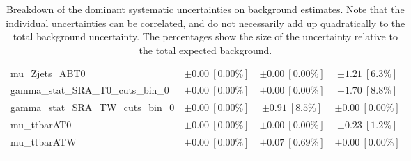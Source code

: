 \begin{table}
\begin{center}
\begin{tabular*}{\textwidth}{@{\extracolsep{\fill}}lccc}
mu\_Zjets\_ABT0         & $\pm 0.00\ [0.00\%] $          & $\pm 0.00\ [0.00\%] $          & $\pm 1.21\ [6.3\%] $       \\
gamma\_stat\_SRA\_T0\_cuts\_bin\_0         & $\pm 0.00\ [0.00\%] $          & $\pm 0.00\ [0.00\%] $          & $\pm 1.70\ [8.8\%] $       \\
gamma\_stat\_SRA\_TW\_cuts\_bin\_0         & $\pm 0.00\ [0.00\%] $          & $\pm 0.91\ [8.5\%] $          & $\pm 0.00\ [0.00\%] $       \\
mu\_ttbarAT0         & $\pm 0.00\ [0.00\%] $          & $\pm 0.00\ [0.00\%] $          & $\pm 0.23\ [1.2\%] $       \\
mu\_ttbarATW         & $\pm 0.00\ [0.00\%] $          & $\pm 0.07\ [0.69\%] $          & $\pm 0.00\ [0.00\%] $       \\
\noalign{\smallskip}\hline\noalign{\smallskip}
\end{tabular*}
\end{center}
\caption[Breakdown of uncertainty on background estimates]{
Breakdown of the dominant systematic uncertainties on background estimates.
Note that the individual uncertainties can be correlated, and do not necessarily add up quadratically to 
the total background uncertainty. The percentages show the size of the uncertainty relative to the total expected background.
\label{table.results.bkgestimate.uncertainties.SRA_TT_SRA_TW_SRA_T0}}
\end{table}
%